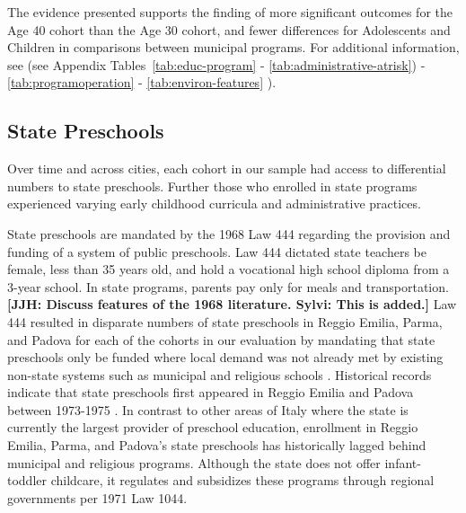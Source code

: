 The evidence presented supports the finding of more significant outcomes for the Age 40 cohort than the Age 30 cohort, and fewer differences for Adolescents and Children in comparisons between municipal programs. For additional information, see (see Appendix Tables~\ref{tab:educ-program} - \ref{tab:administrative-atrisk}) - \ref{tab:programoperation} - \ref{tab:environ-features} ). 

\subsection{State Preschools}

Over time and across cities, each cohort in our sample had access to differential numbers to state preschools. Further those who enrolled in state programs experienced varying early childhood curricula and administrative practices.

State preschools are mandated by the 1968 Law 444 regarding the provision and funding of a system of public preschools. Law 444 dictated state teachers be female, less than 35 years old, and hold a vocational high school diploma from a 3-year school. In state programs, parents pay only for meals and transportation. \textbf{[JJH: Discuss features of the 1968 literature. Sylvi: This is added.]} Law 444 resulted in disparate numbers of state preschools in Reggio Emilia, Parma, and Padova for each of the cohorts in our evaluation by mandating that state preschools only be funded where local demand was not already met by existing non-state systems such as municipal and religious schools \citep{Hohnerlein_2009_Paradox-Public-Preschools}. Historical records indicate that state preschools first appeared in Reggio Emilia and Padova between 1973-1975 \citep{Padova-Admin-Data_1964-2011,Reggio-Admin-data_1966-2006,Reggio-Annual-Journals_1994-2011}. In contrast to other areas of Italy where the state is currently the largest provider of preschool education, enrollment in Reggio Emilia, Parma, and Padova's state preschools has historically lagged behind municipal and religious programs. Although the state does not offer infant-toddler childcare, it regulates and subsidizes these programs through regional governments per 1971 Law 1044.

